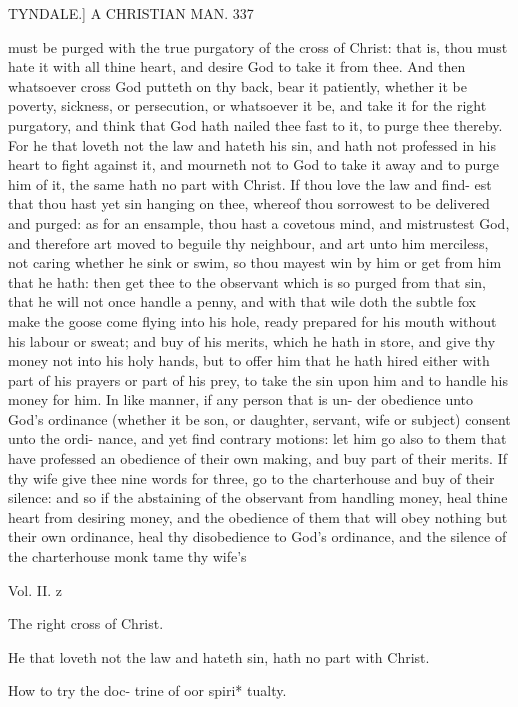 \documentclass{custom}
\begin{document}
{TYNDALE.]
A CHRISTIAN MAN.
337

must be purged with the true purgatory of the cross of 
Christ: that is, thou must hate it with all thine heart, and 
desire God to take it from thee. And then whatsoever 
cross God putteth on thy back, bear it patiently, whether 
it be poverty, sickness, or persecution, or whatsoever it be, 
and take it for the right purgatory, and think that God 
hath nailed thee fast to it, to purge thee thereby. For he 
that loveth not the law and hateth his sin, and hath not 
professed in his heart to fight against it, and mourneth not 
to God to take it away and to purge him of it, the same 
hath no part with Christ. If thou love the law and find- 
est that thou hast yet sin hanging on thee, whereof thou 
sorrowest to be delivered and purged: as for an ensample, 
thou hast a covetous mind, and mistrustest God, and 
therefore art moved to beguile thy neighbour, and art unto 
him merciless, not caring whether he sink or swim, so thou 
mayest win by him or get from him that he hath: then get 
thee to the observant which is so purged from that sin, 
that he will not once handle a penny, and with that wile 
doth the subtle fox make the goose come flying into his 
hole, ready prepared for his mouth without his labour or 
sweat; and buy of his merits, which he hath in store, and 
give thy money not into his holy hands, but to offer him 
that he hath hired either with part of his prayers or part 
of his prey, to take the sin upon him and to handle his 
money for him. In like manner, if any person that is un- 
der obedience unto God's ordinance (whether it be son, or 
daughter, servant, wife or subject) consent unto the ordi- 
nance, and yet find contrary motions: let him go also to 
them that have professed an obedience of their own making, 
and buy part of their merits. If thy wife give thee nine 
words for three, go to the charterhouse and buy of their 
silence: and so if the abstaining of the observant from 
handling money, heal thine heart from desiring money, 
and the obedience of them that will obey nothing but their 
own ordinance, heal thy disobedience to God's ordinance, 
and the silence of the charterhouse monk tame thy wife's 

Vol. II. z 

The right 
cross of 
Christ. 

He that 
loveth not 
the law and 
hateth sin, 
hath no 
part with 
Christ. 

How to try 
the doc- 
trine of 
oor spiri* 
tualty. 

}
\end{document}
